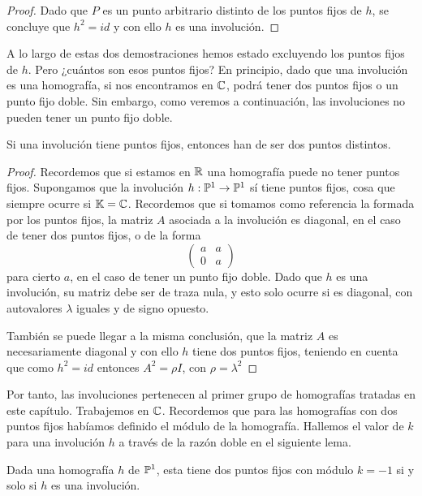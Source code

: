 \begin{proof}
	Dado que $P$ es un punto arbitrario distinto de los puntos fijos de $h$, se concluye que $h^2=id$ y con ello $h$ es una involución.
\end{proof}

A lo largo de estas dos demostraciones hemos estado excluyendo los puntos fijos de $h$. Pero ¿cuántos son esos puntos fijos? En principio, dado que una involución es una homografía, si nos encontramos en $\mathbb{C}$, podrá tener dos puntos fijos o un punto fijo doble. Sin embargo, como veremos a continuación, las involuciones no pueden tener un punto fijo doble.
\begin{lem}
	\label{C6_lem_involucion_puntosfijos}
	Si una involución tiene puntos fijos, entonces han de ser dos puntos distintos.
\end{lem}
\begin{proof}
	Recordemos que si estamos en $\mathbb{R}$ una homografía puede no tener puntos fijos. Supongamos que la involución $h:\mathbb{P}^1\rightarrow\mathbb{P}^1$ sí tiene puntos fijos, cosa que siempre ocurre si $\mathbb{K}=\mathbb{C}$. Recordemos que si tomamos como referencia la formada por los puntos fijos, la matriz $A$ asociada a la involución es diagonal, en el caso de tener dos puntos fijos, o de la forma
	\begin{equation*}
		\left( \begin{array}{cc}
			a&a\\
			0&a
		\end{array}\right) 
	\end{equation*}
	para cierto $a$, en el caso de tener un punto fijo doble. Dado que $h$ es una involución, su matriz debe ser de traza nula, y esto solo ocurre si es diagonal, con autovalores $\lambda$ iguales y de signo opuesto. 
	
	También se puede llegar a la misma conclusión, que la matriz $A$ es necesariamente diagonal y con ello $h$ tiene dos puntos fijos, teniendo en cuenta que como $h^2=id$ entonces $A^2=\rho I$, con $\rho=\lambda^2$
\end{proof}
Por tanto, las involuciones pertenecen al primer grupo de homografías tratadas en este capítulo. Trabajemos en $\mathbb{C}$. Recordemos que para las homografías con dos puntos fijos habíamos definido el módulo de la homografía. Hallemos el valor de $k$ para una involución $h$ a través de la razón doble en el siguiente lema.
\begin{lem}\label{C6:lem_modulo1_sii_involucion}
	Dada una homografía $h$ de $\mathbb{P}^1$, esta tiene dos puntos fijos con módulo $k=-1$ si y solo si $h$ es una involución.
\end{lem}
